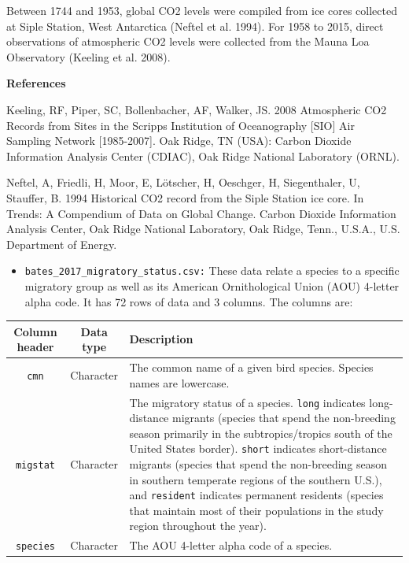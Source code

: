 \documentclass[10pt,a4paper]{article}
\begin{document}
Between 1744 and 1953, global CO2 levels were compiled from ice cores collected at Siple Station, West Antarctica (Neftel et al. 1994). 
For 1958 to 2015, direct observations of atmospheric CO2 levels were collected from the Mauna Loa Observatory (Keeling et al. 2008).

\textbf{References}

Keeling, RF, Piper, SC, Bollenbacher, AF, Walker, JS. 2008 Atmospheric CO2 Records from Sites in the Scripps Institution of Oceanography [SIO] Air Sampling Network [1985-2007]. Oak Ridge, TN (USA): Carbon Dioxide Information Analysis Center (CDIAC), Oak Ridge National Laboratory (ORNL).



Neftel, A, Friedli, H, Moor, E, Lötscher, H, Oeschger, H, Siegenthaler, U, Stauffer, B. 1994
Historical CO2 record from the Siple Station ice core. In Trends: A Compendium of Data on Global Change. Carbon Dioxide Information Analysis Center, Oak Ridge National Laboratory, Oak Ridge, Tenn., U.S.A., U.S. Department of Energy.

\vspace{1.5mm}

\begin{itemize}
\item \texttt{bates\_2017\_migratory\_status.csv:} These data relate a species to a specific migratory group as well as its American Ornithological Union (AOU) 4-letter alpha code. It has 72 rows of data and 3 columns. The columns are:\\
\end{itemize}

\begin{center}
    \begin{tabular}{ | c | c | p{12cm} |}
    \hline
    Column header & Data type & Description\\
    \hline
     \texttt{cmn}& Character & The common name of a given bird species. Species names are lowercase. \\
     \hline
     \texttt{migstat} & Character & The migratory status of a species. \texttt{long} indicates long-distance migrants (species that spend the non-breeding season primarily in the subtropics/tropics south of the United States border). \texttt{short} indicates short-distance migrants (species that spend the non-breeding season in southern temperate regions of the southern U.S.), and \texttt{resident} indicates permanent residents (species that maintain most of their populations in the study region throughout the year).\\
    \hline
    \texttt{species} & Character & The AOU 4-letter alpha code of a species.\\
    \hline
    \end{tabular}
\end{center}
\end{document}
